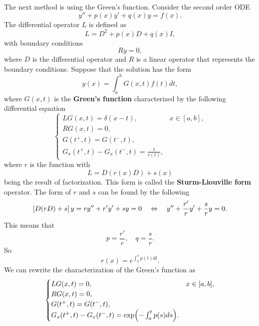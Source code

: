 The next method is using the Green's function. Consider the second order ODE 
\begin{equation*}
    y'' + p(x)y' + q(x)y = f(x).
\end{equation*}
The differential operator $L$ is defined as 
\begin{equation*}
    L = D^2 + p(x)D + q(x)I,
\end{equation*}
with boundary conditions 
\begin{equation*}
    Ry = 0,
\end{equation*} 
where $D$ is the differential operator and $R$ is a linear operator that 
represents the boundary conditions. Suppose that the solution has the form 
\begin{equation*}
    y(x) = \int_a^b G(x,t)f(t)dt,
\end{equation*}
where $G(x,t)$ is the \textbf{Green's function} characterized by the following 
differential equation 
\begin{equation*}
    \begin{cases}
        L G(x,t) = \delta(x-t), & x\in[a,b], \\ 
        R G(x,t) = 0, \\ 
        G(t^+,t) = G(t^-,t), \\
        G_x(t^+,t) - G_x(t^-,t) = \frac{1}{r(t)},
    \end{cases}
\end{equation*}
where $r$ is the function with 
\begin{equation*}
    L = D(r(x)D) + s(x)
\end{equation*}
being the result of factorization. This form is called the \textbf{Sturm-Liouville form} 
operator. The form of $r$ and $s$ can be found by the following 
\begin{equation*}
    \left[ {D(rD) + s} \right]y = ry'' + r'y' + sy = 0 \quad\Leftrightarrow\quad 
    y'' + \frac{r'}{r}y' + \frac{s}{r}y = 0.
\end{equation*}
This means that 
\begin{equation*}
    p = \frac{r'}{r}, \quad q = \frac{s}{r}.
\end{equation*}
So 
\begin{equation*}
    r(x) = e^{\int_a^x p(t)dt}.
\end{equation*}
We can rewrite the characterization of the Green's function as 
\begin{equation*}
    \begin{cases}
        L G(x,t) = 0, & x\in[a,b], \\ 
        R G(x,t) = 0, \\ 
        G(t^+,t) = G(t^-,t), \\
        G_x(t^+,t) - G_x(t^-,t) = \exp\pth{-\int_a^t p(s)ds}.
    \end{cases}
\end{equation*}

